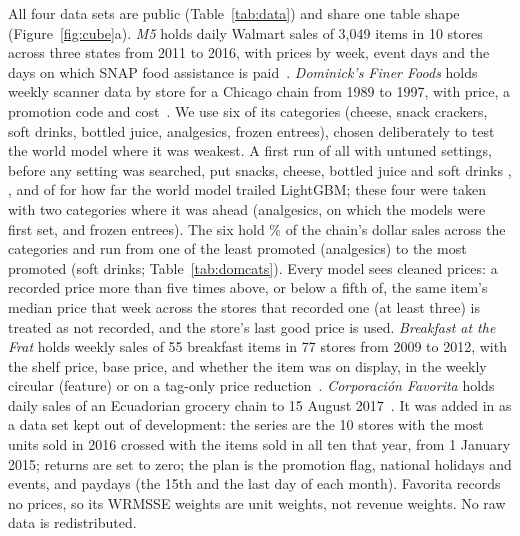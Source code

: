 All four data sets are public (Table~\ref{tab:data}) and share one table shape
(Figure~\ref{fig:cube}a). \emph{M5} holds daily Walmart sales of 3,049 items in 10
stores across three states from 2011 to 2016, with prices by week, event days
and the days on which SNAP food assistance is paid~\cite{m5accuracy}.
\emph{Dominick's Finer Foods} holds weekly scanner data by store for a Chicago
chain from 1989 to 1997, with price, a promotion code and cost~\cite{dominicks}.
We use six of its \domCatN{} categories (cheese, snack crackers, soft
drinks, bottled juice, analgesics, frozen entrees), chosen deliberately to test the world model
where it was weakest. A first run of all \domCatN{} with untuned settings, before any setting was
searched, put snacks, cheese, bottled juice and soft drinks \domCatRankSna{}, \domCatRankChe{},
\domCatRankBjc{} and \domCatRankSdr{} of \domCatN{} for how far the world model trailed LightGBM; these four
were taken with two categories where it was ahead (analgesics, on which the models were first set,
and frozen entrees). The six hold \domCatDollarShare\% of the chain's dollar sales across the
\domCatN{} categories and run from one of the least promoted (analgesics) to the most promoted
(soft drinks; Table~\ref{tab:domcats}). Every model sees cleaned
prices: a recorded price more than five times above, or below a fifth of, the
same item's median price that week across the stores that recorded one (at least
three) is treated as not recorded, and the store's last good price is used. \emph{Breakfast at the Frat}
holds weekly sales of 55 breakfast items in 77 stores from 2009 to 2012, with
the shelf price, base price, and whether the item was on display, in the weekly
circular (feature) or on a tag-only price reduction~\cite{frat}.
\emph{Corporaci\'on Favorita} holds daily sales of an Ecuadorian grocery chain
to 15 August 2017~\cite{favorita}. It was added in \thisrev{} as a data set
kept out of development: the series are the 10 stores with the most units sold
in 2016 crossed with the items sold in all ten that year, from 1 January 2015;
returns are set to zero; the plan is the promotion flag, national holidays and
events, and paydays (the 15th and the last day of each month). Favorita records
no prices, so its WRMSSE weights are unit weights, not revenue weights. No raw
data is redistributed.

